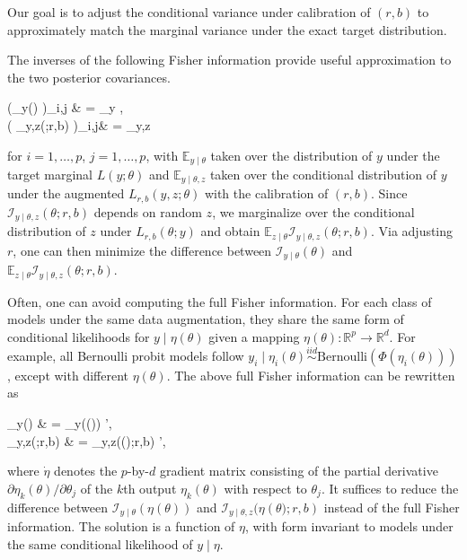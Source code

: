 \documentclass[12pt]{article}
\newcommand{\be}{\begin{equs}}
\newcommand{\ee}{\end{equs}}
\newcommand{\bb}[1]{\mathbb{#1}}
\newcommand{\mc}[1]{\mathcal{#1}}
\newcommand{\Bern}{\text{Bernoulli}}
\begin{document}
{
Our
goal is to adjust the conditional variance under calibration of $(r,b)$ to approximately match the marginal variance under the exact target distribution.
{
The inverses of the following Fisher information provide  useful approximation to the two posterior covariances.

\be   \left (\mc I_{y\mid \theta}({\theta}) \right)_{i,j} &  = \bb E_{y\mid \theta} , \\
 \left(  \mc I_{y\mid \theta,z}({\theta};r,b) \right)_{i,j}& = \bb E_{y\mid \theta,z} 
\ee
}
for $i=1,\ldots,p$, $j=1,\ldots,p$, with $\bb E_{y\mid \theta}$ taken over the distribution of $y$ under the target marginal $L(y;\theta)$ and $\bb E_{y\mid \theta,z}$ taken over the conditional distribution of $y$ under the augmented $L_{r,b}(y,z;\theta)$ with the calibration of $(r,b)$.
Since $\mc I_{y\mid \theta,z}({\theta};r,b)$ depends on random $z$, we marginalize over
the conditional distribution
of $z$ under $L_{r,b}(\theta; y)$ and obtain $\bb E_{z\mid \theta}\mc I_{y\mid \theta,z}(\theta;r,b)$. Via adjusting $r$, one can then  minimize the difference between $\mc  I_{y\mid \theta}(\theta)$
and $\bb E_{z\mid \theta}\mc I_{y\mid \theta,z}(\theta;r,b)$.}

{
Often, one can avoid computing the full Fisher information. For  each class of models under the same data augmentation, they share the same form of conditional likelihoods for $y\mid \eta(\theta)$ given a mapping $\eta(\theta):\bb
R^p\rightarrow \bb R^d $.
 For example,  all Bernoulli probit models  follow $y_{i}\mid \eta_{i}(\theta) \stackrel{iid}{\sim}\Bern( \Phi(\eta_{i}(\theta)) )$, except with different  $\eta(\theta)$. The above full Fisher information can be rewritten as
 \be\mc I_{y\mid \theta}({\theta})  &  =  \dot \eta\mc I_{y\mid \theta}(\eta({\theta}))  \dot \eta', \\
  \mc I_{y\mid \theta,z}({\theta};r,b) & = \dot \eta\mc I_{y\mid \theta,z}(\eta({\theta)};r,b)  \dot \eta',
\ee
where $\dot \eta$ denotes the $p$-by-$d$ gradient matrix consisting of the partial
derivative ${\partial
\eta_{k}(\theta)}/{\partial \theta_j}$ of  the $k$th output 
$\eta_{k}(\theta)$ with respect to $\theta_j$. It suffices to reduce the difference between  $\mc I_{y\mid \theta}(\eta({\theta}))$  and $\mc I_{y\mid \theta,z}(\eta({\theta)};r,b)$ instead of the full Fisher
 information. The solution is a function of $\eta$, with form invariant to models under the same conditional likelihood of $y\mid \eta$.
 }
\end{document}

